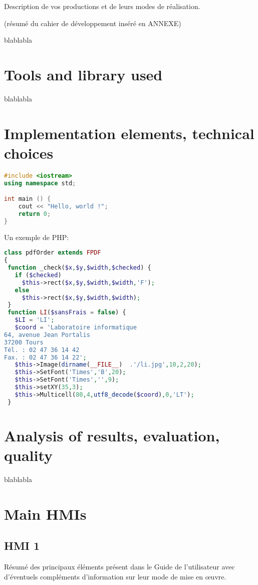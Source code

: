 \documentclass{polytech/polytech}
\numberwithin{figure}{chapter}
\begin{document}
Description de vos productions et de leurs modes de réalisation.

(résumé du cahier de développement inséré en ANNEXE)

blablabla

\section{Tools and library used}

blablabla

\section{Implementation elements, technical choices}

\begin{lstlisting}[language=C++]
#include <iostream>
using namespace std;

int main () {
    cout << "Hello, world !";
    return 0;
}
\end{lstlisting}

Un exemple de PHP:
\begin{lstlisting}[language=php]
class pdfOrder extends FPDF
{
 function _check($x,$y,$width,$checked) {
   if ($checked)
     $this->rect($x,$y,$width,$width,'F');
   else
     $this->rect($x,$y,$width,$width);
 }
 function LI($sansFrais = false) {
   $LI = 'LI';
   $coord = 'Laboratoire informatique
64, avenue Jean Portalis
37200 Tours
Tél. : 02 47 36 14 42
Fax. : 02 47 36 14 22';
   $this->Image(dirname(__FILE__)  .'/li.jpg',10,2,20);
   $this->SetFont('Times','B',20);
   $this->SetFont('Times','',9);
   $this->setXY(35,3);
   $this->Multicell(80,4,utf8_decode($coord),0,'LT');
 }
\end{lstlisting}

\section{Analysis of results, evaluation, quality}

blablabla


\section{Main HMIs}

\subsection{HMI 1}

Résumé des principaux éléments présent dans le Guide de l'utilisateur
avec d'éventuels compléments d'information sur leur mode de mise en œuvre.
\end{document}
